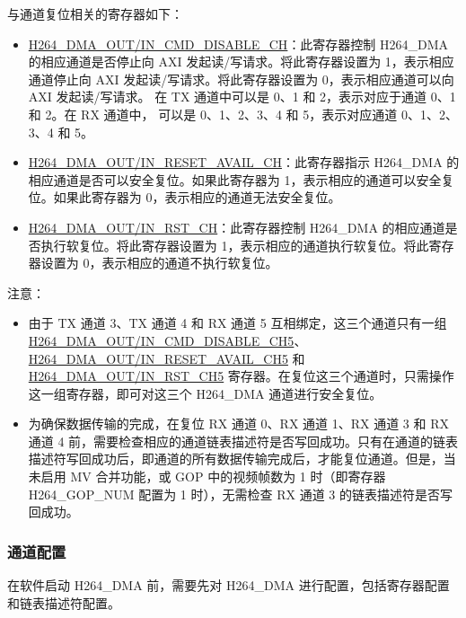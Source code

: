 \documentclass[main\_\_CN.tex]{subfiles}
\begin{document}
与通道复位相关的寄存器如下：
\begin{itemize}
    \item \hyperref[fielddesc:H264DMAOUTCMDDISABLECH0]{H264\_DMA\_OUT/IN\_CMD\_DISABLE\_CH}：此寄存器控制 H264\_DMA 的相应通道是否停止向 AXI 发起读/写请求。将此寄存器设置为 1，表示相应通道停止向 AXI 发起读/写请求。将此寄存器设置为 0，表示相应通道可以向 AXI 发起读/写请求。 在 TX 通道中可以是 0、1 和 2，表示对应于通道 0、1 和 2。在 RX 通道中， 可以是 0、1、2、3、4 和 5，表示对应通道 0、1、2、3、4 和 5。
    \item \hyperref[fielddesc:H264DMAOUTRESETAVAILCH0]{H264\_DMA\_OUT/IN\_RESET\_AVAIL\_CH}：此寄存器指示 H264\_DMA 的相应通道是否可以安全复位。如果此寄存器为 1，表示相应的通道可以安全复位。如果此寄存器为 0，表示相应的通道无法安全复位。
    \item \hyperref[fielddesc:H264DMAOUTRSTCH0]{H264\_DMA\_OUT/IN\_RST\_CH}：此寄存器控制 H264\_DMA 的相应通道是否执行软复位。将此寄存器设置为 1，表示相应的通道执行软复位。将此寄存器设置为 0，表示相应的通道不执行软复位。
\end{itemize}

注意：
\begin{itemize}
    \item 由于 TX 通道 3、TX 通道 4 和 RX 通道 5 互相绑定，这三个通道只有一组 \hyperref[fielddesc:H264DMAINCMDDISABLECH5]{H264\_DMA\_OUT/IN\_CMD\_DISABLE\_CH5}、\hyperref[fielddesc:H264DMAINRESETAVAILCH5]{H264\_DMA\_OUT/IN\_RESET\_AVAIL\_CH5} 和 \hyperref[fielddesc:H264DMAINRSTCH5]{H264\_DMA\_OUT/IN\_RST\_CH5} 寄存器。在复位这三个通道时，只需操作这一组寄存器，即可对这三个 H264\_DMA 通道进行安全复位。
    \item 为确保数据传输的完成，在复位 RX 通道 0、RX 通道 1、RX 通道 3 和 RX 通道 4 前，需要检查相应的通道链表描述符是否写回成功。只有在通道的链表描述符写回成功后，即通道的所有数据传输完成后，才能复位通道。但是，当未启用 MV 合并功能，或 GOP 中的视频帧数为 1 时（即寄存器 H264\_GOP\_NUM 配置为 1 时），无需检查 RX 通道 3 的链表描述符是否写回成功。
\end{itemize}

\subsubsection{通道配置}\label{sec:h264-dma-ch-cfg}
在软件启动 H264\_DMA 前，需要先对 H264\_DMA 进行配置，包括寄存器配置和链表描述符配置。
\end{document}
